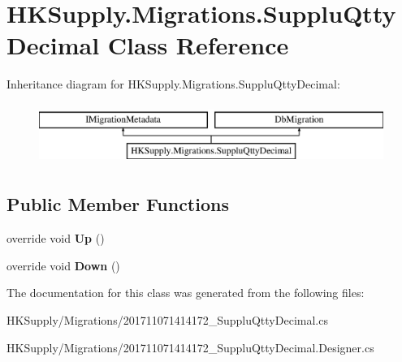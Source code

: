 \hypertarget{class_h_k_supply_1_1_migrations_1_1_supplu_qtty_decimal}{}\section{H\+K\+Supply.\+Migrations.\+Supplu\+Qtty\+Decimal Class Reference}
\label{class_h_k_supply_1_1_migrations_1_1_supplu_qtty_decimal}
Inheritance diagram for H\+K\+Supply.\+Migrations.\+Supplu\+Qtty\+Decimal\+:\begin{figure}[H]
\begin{center}
\leavevmode
\includegraphics[height=2.000000cm]{class_h_k_supply_1_1_migrations_1_1_supplu_qtty_decimal}
\end{center}
\end{figure}
\subsection*{Public Member Functions}
\begin{DoxyCompactItemize}
\item 
\mbox{\label{class_h_k_supply_1_1_migrations_1_1_supplu_qtty_decimal_ab330b374c7fd5466a315ba9caae95ce4}} 
override void {\bfseries Up} ()
\item 
\mbox{\label{class_h_k_supply_1_1_migrations_1_1_supplu_qtty_decimal_a9e87fdc22ad3c374774353e90e9c875c}} 
override void {\bfseries Down} ()
\end{DoxyCompactItemize}


The documentation for this class was generated from the following files\+:\begin{DoxyCompactItemize}
\item 
H\+K\+Supply/\+Migrations/201711071414172\+\_\+\+Supplu\+Qtty\+Decimal.\+cs\item 
H\+K\+Supply/\+Migrations/201711071414172\+\_\+\+Supplu\+Qtty\+Decimal.\+Designer.\+cs\end{DoxyCompactItemize}
